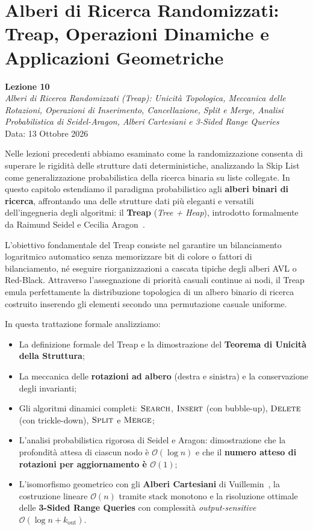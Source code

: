 \chapter{Alberi di Ricerca Randomizzati: Treap, Operazioni Dinamiche e Applicazioni Geometriche}
\label{chap:randomized-search-trees-treaps}

\begin{center}
  \textbf{Lezione 10}\\
  \emph{Alberi di Ricerca Randomizzati (Treap): Unicit\`a Topologica, Meccanica delle Rotazioni, Operazioni di Inserimento, Cancellazione, Split e Merge, Analisi Probabilistica di Seidel-Aragon, Alberi Cartesiani e 3-Sided Range Queries}\\[0.5em]
  Data: 13 Ottobre 2026
\end{center}

Nelle lezioni precedenti abbiamo esaminato come la randomizzazione consenta di superare le rigidit\`a delle strutture dati deterministiche, analizzando la Skip List come generalizzazione probabilistica della ricerca binaria su liste collegate. In questo capitolo estendiamo il paradigma probabilistico agli \textbf{alberi binari di ricerca}, affrontando una delle strutture dati pi\`u eleganti e versatili dell'ingegneria degli algoritmi: il \textbf{Treap} (\textit{Tree + Heap}), introdotto formalmente da Raimund Seidel e Cecilia Aragon~\cite{seidel1996}.

L'obiettivo fondamentale del Treap consiste nel garantire un bilanciamento logaritmico automatico senza memorizzare bit di colore o fattori di bilanciamento, n\'e eseguire riorganizzazioni a cascata tipiche degli alberi AVL o Red-Black. Attraverso l'assegnazione di priorit\`a casuali continue ai nodi, il Treap emula perfettamente la distribuzione topologica di un albero binario di ricerca costruito inserendo gli elementi secondo una permutazione casuale uniforme.

In questa trattazione formale analizziamo:
\begin{itemize}
    \item La definizione formale del Treap e la dimostrazione del \textbf{Teorema di Unicit\`a della Struttura};
    \item La meccanica delle \textbf{rotazioni ad albero} (destra e sinistra) e la conservazione degli invarianti;
    \item Gli algoritmi dinamici completi: $\textsc{Search}$, $\textsc{Insert}$ (con bubble-up), $\textsc{Delete}$ (con trickle-down), $\textsc{Split}$ e $\textsc{Merge}$;
    \item L'analisi probabilistica rigorosa di Seidel e Aragon: dimostrazione che la profondit\`a attesa di ciascun nodo \`e $\mathcal{O}(\log n)$ e che il \textbf{numero atteso di rotazioni per aggiornamento \`e $\mathcal{O}(1)$};
    \item L'isomorfismo geometrico con gli \textbf{Alberi Cartesiani} di Vuillemin~\cite{vuillemin1980}, la costruzione lineare $\mathcal{O}(n)$ tramite stack monotono e la risoluzione ottimale delle \textbf{3-Sided Range Queries} con complessit\`a \textit{output-sensitive} $\mathcal{O}(\log n + k_{\text{out}})$.
\end{itemize}

